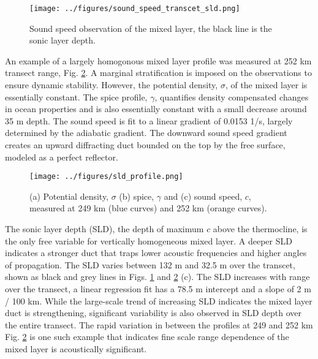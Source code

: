 \documentclass[preprint,NumberedRefs]{JASA}
\begin{document}
\begin{figure}
\texttt{[image: ../figures/sound\_speed\_transcet\_sld.png]}
\caption{\label{fig:c_grid}{Sound speed observation of the mixed layer, the black line is the sonic layer depth.}}
\end{figure}

An example of a largely homogonous mixed layer profile was measured at 252 km transect range, Fig. \ref{fig:profiles}. A marginal stratification is imposed on the observations to ensure dynamic stability\citep{}. However, the potential density, $\sigma$, of the mixed layer is essentially constant. The spice profile, $\gamma$, quantifies density compensated changes in ocean properties and is also essentially constant with a small decrease around 35 m depth. The sound speed is fit to a linear gradient of 0.0153 1/s, largely determined by the adiabatic gradient. The downward sound speed gradient creates an upward diffracting duct bounded on the top by the free surface, modeled as a perfect reflector.

\begin{figure}
\texttt{[image: ../figures/sld\_profile.png]}
    \caption{\label{fig:profiles}{(a) Potential density, $\sigma$ (b) spice, $\gamma$ and (c) sound speed, $c$, measured at 249 km (blue curves) and 252 km (orange curves).}}
\end{figure}

The sonic layer depth (SLD), the depth of maximum $c$ above the thermocline, is the only free variable for vertically homogeneous mixed layer. A deeper SLD indicates a stronger duct that traps lower acoustic frequencies and higher angles of propagation. The SLD varies between 132 m and 32.5 m over the transcet, shown as black and grey lines in Figs. \ref{fig:c_grid} and \ref{fig:profiles} (c). The SLD increases with range over the transect, a linear regression fit has a 78.5 m intercept and a slope of 2 m / 100 km. While the large-scale trend of increasing SLD indicates the mixed layer duct is strengthening, significant variability is also observed in SLD depth over the entire transect. The rapid variation in between the profiles at 249 and 252 km Fig. \ref{fig:profiles} is one such example that indicates fine scale range dependence of the mixed layer is acoustically significant.
\end{document}
